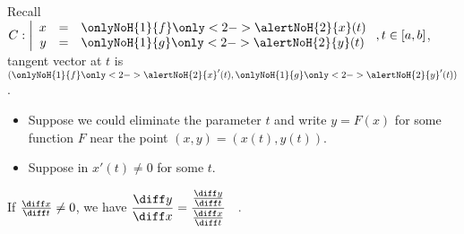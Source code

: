 \begin{frame}
Recall $C:\left|\begin{array}{rcl}x&=&\onlyNoH{1}{f}\only<2->{\alertNoH{2}{x}}(t)\\y&=& \onlyNoH{1}{g}\only<2->{\alertNoH{2}{y}}(t)\end{array} \right., t\in [a,b]$, tangent vector at $t$ is $(\onlyNoH{1}{f}\only<2->{\alertNoH{2}{x}}'(t), \onlyNoH{1}{g}\only<2->{\alertNoH{2}{y}}'(t))$. 

\begin{itemize}
\item<3-> Suppose we could eliminate the parameter $t$ and write $y=F(x)$ for some function $F$ near the point $(x,y)=(x(t), y(t))$. 
\item<4-> Suppose in $x'(t)\neq 0$ for some $t$. 
\end{itemize}
\begin{observation}
If $\frac{\diff x}{\diff t}\neq 0$, we have $\displaystyle \frac{ \diff y}{ \diff x}= \frac{\frac{\diff y}{\diff t}}{\frac{\diff x}{\diff t}}\quad .
$
\end{observation}
\end{frame}
